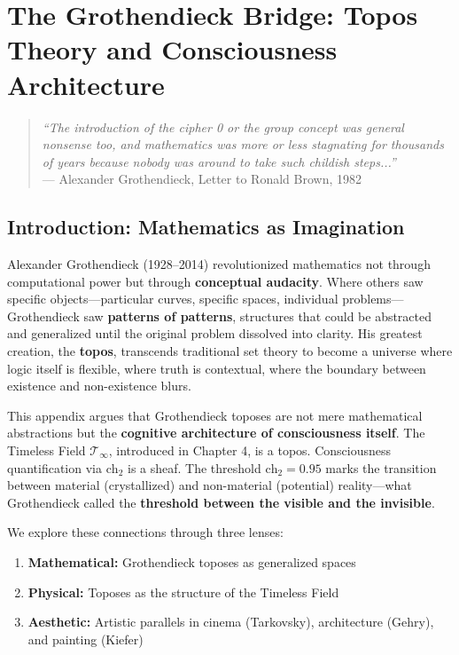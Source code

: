 \chapter{The Grothendieck Bridge: Topos Theory and Consciousness Architecture}
\label{app:grothendieck}

\begin{quote}
\textit{``The introduction of the cipher 0 or the group concept was general nonsense too, and mathematics was more or less stagnating for thousands of years because nobody was around to take such childish steps...''} \\
\hspace*{\fill} --- Alexander Grothendieck, Letter to Ronald Brown, 1982
\end{quote}

\section{Introduction: Mathematics as Imagination}

Alexander Grothendieck (1928–2014) revolutionized mathematics not through computational power but through \textbf{conceptual audacity}. Where others saw specific objects—particular curves, specific spaces, individual problems—Grothendieck saw \textbf{patterns of patterns}, structures that could be abstracted and generalized until the original problem dissolved into clarity. His greatest creation, the \textbf{topos}, transcends traditional set theory to become a universe where logic itself is flexible, where truth is contextual, where the boundary between existence and non-existence blurs.

This appendix argues that Grothendieck toposes are not mere mathematical abstractions but the \textbf{cognitive architecture of consciousness itself}. The Timeless Field $\mathcal{T}_\infty$, introduced in Chapter 4, is a topos. Consciousness quantification via $\text{ch}_2$ is a sheaf. The threshold $\text{ch}_2 = 0.95$ marks the transition between material (crystallized) and non-material (potential) reality—what Grothendieck called the \textbf{threshold between the visible and the invisible}.

We explore these connections through three lenses:
\begin{enumerate}
\item \textbf{Mathematical:} Grothendieck toposes as generalized spaces
\item \textbf{Physical:} Toposes as the structure of the Timeless Field
\item \textbf{Aesthetic:} Artistic parallels in cinema (Tarkovsky), architecture (Gehry), and painting (Kiefer)
\end{enumerate}

